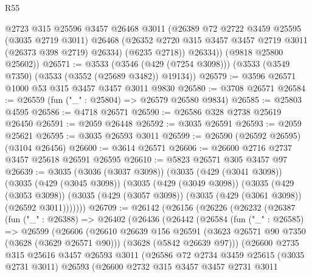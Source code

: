 \begin{lexlean}{R55}
\begin{coremodule}
          @2723
          @315
          @25596
          @3457
          @26468
          @3011
          (@26389
            @72
            @2722
            @3459
            @25595
            (@3035 @2719 @3011)
            @26468
            (@26352 @2720 @315 @3457 @3457 @2719 @3011 (@26373 @398 @2719) @26334)
            (@6235 @2718))
          @26334))
      (@9818 @25800 @25602))
@26571 := @3533
    (@3546 (@429 (@7254 @3098)))
    (@3533 (@3549 @7350) (@3533 (@3552 (@25689 @3482)) @19134))
@26579 := @3596 @26571 @1000 @53 @315 @3457 @3457 @3011 @9830
@26580 := @3708 @26571
@26584 := @26559 (fun ("_" : @25804) => @26579 @26580 @9834)
@26585 := @25803 @4595
@26586 := @4718 @26571
@26590 := @26586 @328 @2738 @25619 @26450
@26591 := @2059 @26448
@26592 := @3035 @26591
@26593 := @2059 @25621
@26595 := @3035 @26593 @3011
@26599 := @26590 (@26592 @26595) (@3104 @26456)
@26600 := @3614 @26571
@26606 := @26600 @2716 @2737 @3457 @25618 @26591 @26595
@26610 := @5823 @26571 @305 @3457 @97
@26639 := @3035
    (@3036 (@3037 @3098))
    (@3035
      (@429 (@3041 @3098))
      (@3035
        (@429 (@3045 @3098))
        (@3035
          (@429 (@3049 @3098))
          (@3035
            (@429 (@3053 @3098))
            (@3035 (@429 (@3057 @3098)) (@3035 (@429 (@3061 @3098)) (@26592 @3011)))))))
@26709 := @26142
    (@26156
      (@26226
        (@26232
          (@26387
            (fun ("_" : @26388) =>
            @26402
              (@26436
                (@26442
                  (@26584
                    (fun ("_" : @26585) =>
                    @26599
                      (@26606
                        (@26610
                          @26639
                          @156
                          @26591
                          (@3623 @26571 @90 @7350 (@3628 (@3629 @26571 @90)))
                          (@3628 (@5842 @26639 @97)))
                        (@26600
                          @2735
                          @315
                          @25616
                          @3457
                          @26593
                          @3011
                          (@26586
                            @72
                            @2734
                            @3459
                            @25615
                            (@3035 @2731 @3011)
                            @26593
                            (@26600
                              @2732
                              @315
                              @3457
                              @3457
                              @2731
                              @3011

\end{coremodule}
\end{lexlean}
